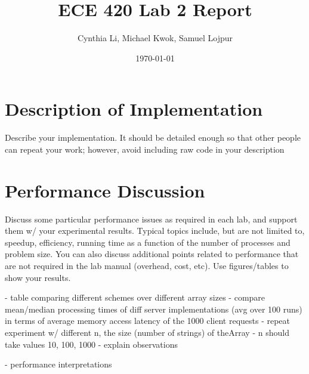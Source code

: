\documentclass[12pt]{report}
\title{ECE 420 Lab 2 Report}
\author{Cynthia Li, Michael Kwok, Samuel Lojpur}
\date{\today}
\begin{document}
\maketitle
\section{Description of Implementation}

Describe your implementation. It should be detailed enough so that other people can repeat your work; however, avoid including raw code in your description

\section{Performance Discussion}
Discuss some particular performance issues as required in each lab, and support them w/ your experimental results. Typical topics include, but are not limited to, speedup, efficiency, running time as a function of the number of processes and problem size. You can also discuss additional points related to performance that are not required in the lab manual (overhead, cost, etc). Use figures/tables to show your results.

- table comparing different schemes over different array sizes
    - compare mean/median processing times of diff server implementations (avg over 100 runs) in terms of average memory access latency of the 1000 client requests
    - repeat experiment w/ different n, the size (number of strings) of theArray
        - n should take values 10, 100, 1000
- explain observations

- performance interpretations
\end{document}
